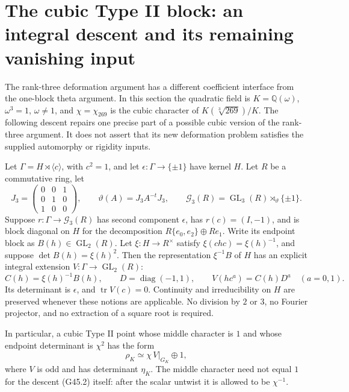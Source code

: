\section{The cubic Type II block: an integral descent and its remaining vanishing input}
\label{sec:cubic-type-ii-descent}

The rank-three deformation argument has a different coefficient interface
from the one-block theta argument.  In this section the quadratic field
is $K=\mathbb Q(\omega)$, $\omega^3=1$, $\omega\ne1$, and
$\chi=\chi_{269}$ is the cubic character of $K(\sqrt[3]{269})/K$.
The following descent repairs one precise part of a possible cubic
version of the rank-three argument.  It does not assert that its new
deformation problem satisfies the supplied automorphy or rigidity inputs.

\begin{proposition}
\label{AC-G45}
Let $\Gamma=H\rtimes\langle c\rangle$, with $c^2=1$, and let
$\epsilon:\Gamma\longrightarrow\{\pm1\}$ have kernel $H$.
Let $R$ be a commutative ring, let
\[
 J_3=\begin{pmatrix}0&0&1\\0&1&0\\1&0&0\end{pmatrix},
 \qquad \vartheta(A)=J_3 A^{-t}J_3,
 \qquad \mathcal G_3(R)=\operatorname{GL}_3(R)
                      \rtimes_{\vartheta}\{\pm1\}.       \tag{G45.1}
\]
Suppose $r:\Gamma\to\mathcal G_3(R)$ has second component
$\epsilon$, has $r(c)=(I,-1)$, and is block diagonal on $H$
for the decomposition $R\{e_0,e_2\}\oplus Re_1$.
Write its endpoint block as $B(h)\in\operatorname{GL}_2(R)$.
Let $\xi:H\to R^\times$ satisfy $\xi(chc)=\xi(h)^{-1}$,
and suppose $\det B(h)=\xi(h)^2$.
Then the representation $\xi^{-1}B$ of $H$ has an explicit
integral extension $V:\Gamma\to\operatorname{GL}_2(R)$:
\[
 C(h)=\xi(h)^{-1}B(h),\qquad
 D=\operatorname{diag}(-1,1),\qquad
 V(hc^a)=C(h)D^a\quad(a=0,1).                         \tag{G45.2}
\]
Its determinant is $\epsilon$, and $\operatorname{tr}V(c)=0$.
Continuity and irreducibility on $H$ are preserved whenever
these notions are applicable.  No division by $2$ or $3$, no
Fourier projector, and no extraction of a square root is required.

In particular, a cubic Type II point whose middle character is $1$
and whose endpoint determinant is $\chi^2$ has the form
\[
                 \rho_K\simeq\chi\,V|_{G_K}\oplus1,   \tag{G45.3}
\]
where $V$ is odd and has determinant $\eta_K$.
The middle character need not equal $1$ for the descent (G45.2)
itself: after the scalar untwist it is allowed to be $\chi^{-1}$.
\end{proposition}
